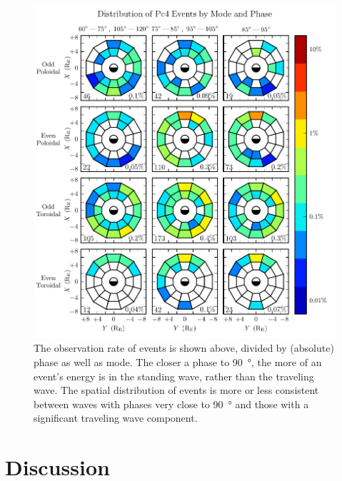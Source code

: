 \begin{figure}[!htb]
  \centering
  \includegraphics[width=\textwidth]{figures/mode_phase.pdf}
  \caption[Rate of Pc4 Events by Mode and Phase]{
    The observation rate of events is shown above, divided by (absolute) phase
    as well as mode. The closer a phase to \SI{90}{\degree}, the more of an
    event's energy is in the standing wave, rather than the traveling wave. The
    spatial distribution of events is more or less consistent between waves
    with phases very close to \SI{90}{\degree} and those with a significant
    traveling wave component. 
  }
  \label{fig_mode_phase}
\end{figure}

\section{Discussion}


